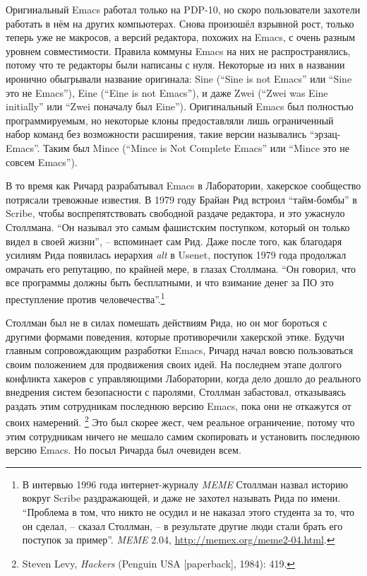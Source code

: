 Оригинальный Emacs работал только на PDP-10, но скоро пользователи захотели работать в нём на других компьютерах. Снова произошёл взрывной рост, только теперь уже не макросов, а версий редактора, похожих на Emacs, с очень разным уровнем совместимости. Правила коммуны Emacs на них не распространялись, потому что те редакторы были написаны с нуля. Некоторые из них в названии иронично обыгрывали название оригинала: Sine (\enquote{Sine is not Emacs} или \enquote{Sine это не Emacs}), Eine (\enquote{Eine is not Emacs}), и даже Zwei (\enquote{Zwei was Eine initially} или \enquote{Zwei поначалу был Eine}). Оригинальный Emacs был полностью программируемым, но некоторые клоны предоставляли лишь ограниченный набор команд без возможности расширения, такие версии назывались \enquote{эрзац-Emacs}. Таким был Mince (\enquote{Mince is Not Complete Emacs} или \enquote{Mince это не совсем Emacs}).

В то время как Ричард разрабатывал Emacs в Лаборатории, хакерское сообщество потрясали тревожные известия. В 1979 году Брайан Рид встроил \enquote{тайм-бомбы} в Scribe, чтобы воспрепятствовать свободной раздаче редактора, и это ужаснуло Столлмана. \enquote{Он называл это самым фашистским поступком, который он только видел в своей жизни}, -- вспоминает сам Рид. Даже после того, как благодаря усилиям Рида появилась иерархия \textit{alt} в Usenet, поступок 1979 года продолжал омрачать его репутацию, по крайней мере, в глазах Столлмана. \enquote{Он говорил, что все программы должны быть бесплатными, и что взимание денег за ПО это преступление против человечества}.\footnote{В интервью 1996 года интернет-журналу \textit{MEME} Столлман назвал историю вокруг Scribe раздражающей, и даже не захотел называть Рида по имени. \enquote{Проблема в том, что никто не осудил и не наказал этого студента за то, что он сделал, -- сказал Столлман, -- в результате другие люди стали брать его поступок за пример}. \textit{MEME} 2.04, \url{http://memex.org/meme2-04.html}.}

Столлман был не в силах помешать действиям Рида, но он мог бороться с другими формами поведения, которые противоречили хакерской этике. Будучи главным сопровождающим разработки Emacs, Ричард начал вовсю пользоваться своим положением для продвижения своих идей. На последнем этапе долгого конфликта хакеров с управляющими Лаборатории, когда дело дошло до реального внедрения систем безопасности с паролями, Столлман забастовал, отказываясь раздать этим сотрудникам последнюю версию Emacs, пока они не откажутся от своих намерений. \footnote{Steven Levy, \textit{Hackers} (Penguin USA [paperback], 1984): 419.} Это был скорее жест, чем реальное ограничение, потому что этим сотрудникам ничего не мешало самим скопировать и установить последнюю версию Emacs. Но посыл Ричарда был очевиден всем.

